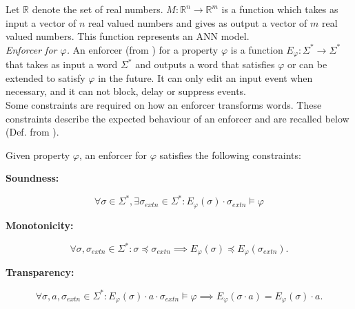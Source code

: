 Let $\mathbb{R}$ denote the set of real numbers. $M:\mathbb{R}^n \rightarrow \mathbb{R}^m$ is a function which takes as input a vector of $n$ real valued numbers and gives as output a vector of $m$ real valued numbers. This function represents an ANN model. \\


\noindent \textit{Enforcer for $\varphi$.} An enforcer (from \cite{10.1109/TII.2019.2945520}) for a property $\varphi$  is a function $E_{\varphi} : \Sigma^{\ast} \rightarrow \Sigma^{\ast}$ that takes as input a word $\Sigma^{\ast} $ and outputs a word that satisfies $\varphi$ or can be extended to satisfy $\varphi$ in the future. It can only edit an input event when necessary, and it can not block, delay or suppress events.\\

Some constraints are required on how an enforcer transforms words. These constraints describe the expected behaviour of an enforcer and are recalled below (Def. from \cite{}).
\begin{definition}
    Given property $\varphi$, an enforcer for $\varphi$ satisfies the following constraints:
        \begin{flushleft}
            \textbf{Soundness:}
        \end{flushleft}
        \begin{equation*}
            \label{eq:snd}
              \forall \sigma \in \Sigma^{\ast}, \exists \sigma_{extn} \in \Sigma^{\ast} : E_{\varphi} (\sigma) \cdot \sigma_{extn} \models \varphi
        \end{equation*}
        
        \begin{flushleft}
            \textbf{Monotonicity:}
        \end{flushleft}
        \begin{equation*}
            \label{eq:mo}
              \forall \sigma, \sigma_{extn} \in \Sigma^{\ast}: \sigma \preccurlyeq \sigma_{extn} \implies E_{\varphi} (\sigma) \preccurlyeq E_{\varphi} (\sigma_{extn}).
        \end{equation*}	

        \begin{flushleft}
            \textbf{Transparency:}
        \end{flushleft}
        \begin{equation*}
            \label{eq:tr}
              \forall \sigma, a, \sigma_{extn} \in \Sigma^{\ast} : E_{\varphi} (\sigma) \cdot a \cdot \sigma_{extn} \models \varphi \implies E_{\varphi} (\sigma \cdot a) = E_{\varphi} (\sigma) \cdot a.
        \end{equation*}	
        \label{constraints1}
\end{definition}
